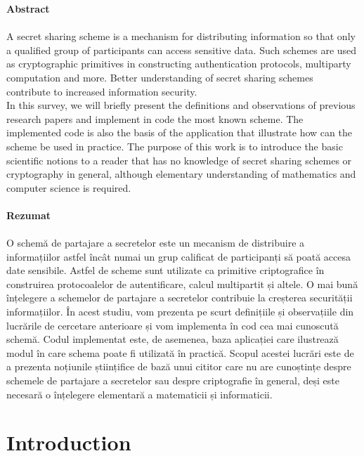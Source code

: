 \documentclass[12pt, a4paper, oneside]{book}
\begin{document}
    \pagestyle{plain}
    \setlength{\parindent}{10pt}
    \hspace{-0.35cm}\textbf{\huge Abstract} 
    \\~\\
    A secret sharing scheme is a mechanism for distributing information so that only a qualified group of participants can access sensitive data. Such schemes are used as cryptographic primitives in constructing authentication protocols, multiparty computation and more. Better understanding of secret sharing schemes contribute to increased information security.\\
    In this survey, we will briefly present the definitions and observations of previous research papers and implement in code the most known scheme. The implemented code is also the basis of the application that illustrate how can the scheme be used in practice. The purpose of this work is to introduce the basic scientific notions to a reader that has no knowledge of secret sharing schemes or cryptography in general, although elementary understanding of mathematics and computer science is required.
    \vspace{1cm}
    \\~\\
    \textbf{\huge Rezumat}
    \\~\\
    O schemă de partajare a secretelor este un mecanism de distribuire a informațiilor astfel încât numai un grup calificat de participanți să poată accesa date sensibile. Astfel de scheme sunt utilizate ca primitive criptografice în construirea protocoalelor de autentificare, calcul multipartit și altele. O mai bună înțelegere a schemelor de partajare a secretelor contribuie la creșterea securității informațiilor.
    În acest studiu, vom prezenta pe scurt definițiile și observațiile din lucrările de cercetare anterioare și vom implementa în cod cea mai cunoscută schemă. Codul implementat este, de asemenea, baza aplicației care ilustrează modul în care schema poate fi utilizată în practică. Scopul acestei lucrări este de a prezenta noțiunile științifice de bază unui cititor care nu are cunoștințe despre schemele de partajare a secretelor sau despre criptografie în general, deși este necesară o înțelegere elementară a matematicii și informaticii.
    \chapter{Introduction}
\end{document}
